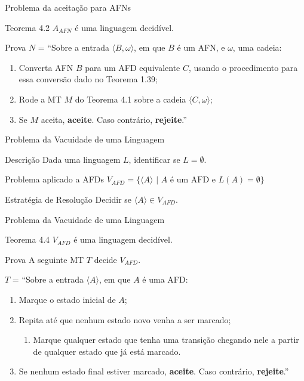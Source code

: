 \documentclass[xcolor=dvipsnames,table]{beamer}
\begin{document}
	\begin{frame}{Problema da aceitação para AFNs}
		\begin{block}{Teorema 4.2}
			$A_{AFN}$ é uma linguagem decidível.
		\end{block}  
		\begin{block}{Prova}
			$N$ = ``Sobre a entrada $\langle B, \omega \rangle$, em que $B$ é um AFN, e $\omega$, uma cadeia:
			\begin{enumerate}
				\item Converta AFN $B$ para um AFD equivalente $C$, usando o procedimento para essa conversão dado no Teorema 1.39;
				\item Rode a MT $M$ do Teorema 4.1 sobre a cadeia $\langle C, \omega \rangle$;
				\item Se $M$ aceita, {\bf aceite}. Caso contrário, {\bf rejeite}.''
			\end{enumerate}
		\end{block}
	\end{frame}
	
	\begin{frame}{Problema da Vacuidade de uma Linguagem}
		\begin{block}{Descrição}
			Dada uma linguagem $L$, identificar se $L = \emptyset$.
		\end{block}	
		\begin{block}{Problema aplicado a AFDs}
			$V_{AFD} = \{ \langle A \rangle \mbox{ | } A \mbox{ é um AFD e } L(A) = \emptyset \}$
		\end{block} 
		\begin{block}{Estratégia de Resolução}
			Decidir se $\langle A \rangle \in V_{AFD}$.
		\end{block}
	\end{frame}	
	
	\begin{frame}{Problema da Vacuidade de uma Linguagem}
		\begin{block}{Teorema 4.4}
			$V_{AFD}$ é uma linguagem decidível.
		\end{block}  
		\begin{block}{Prova}
			A seguinte MT $T$ decide $V_{AFD}$.
			
			$T$ = ``Sobre a entrada $\langle A \rangle$, em que $A$ é uma AFD:
			\begin{enumerate}
				\item Marque o estado inicial de $A$;
				\item Repita até que nenhum estado novo venha a ser marcado;
				\begin{enumerate}
					\item Marque qualquer estado que tenha uma transição chegando nele a partir de qualquer estado que já está marcado.
				\end{enumerate}
				\item Se nenhum estado final estiver marcado, {\bf aceite}. Caso contrário, {\bf rejeite}.''
			\end{enumerate}
		\end{block}
	\end{frame}
\end{document}
